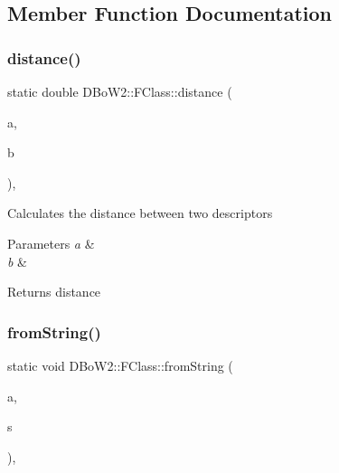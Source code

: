 \subsection{Member Function Documentation}
\mbox{\label{class_d_bo_w2_1_1_f_class_a56d4737dd67258389c808dbd10befa8c}} 
\subsubsection{\texorpdfstring{distance()}{distance()}}
{\footnotesize\ttfamily static double D\+Bo\+W2\+::\+F\+Class\+::distance (\begin{DoxyParamCaption}\item[{const T\+Descriptor \&}]{a,  }\item[{const T\+Descriptor \&}]{b }\end{DoxyParamCaption})\hspace{0.3cm}{\ttfamily [static]}, {\ttfamily [private]}}

Calculates the distance between two descriptors 
\begin{DoxyParams}{Parameters}
{\em a} & \\
\hline
{\em b} & \\
\hline
\end{DoxyParams}
\begin{DoxyReturn}{Returns}
distance 
\end{DoxyReturn}
\mbox{\label{class_d_bo_w2_1_1_f_class_a0f27985bf4c13f0a6c12ebc4822c1217}} 
\subsubsection{\texorpdfstring{from\+String()}{fromString()}}
{\footnotesize\ttfamily static void D\+Bo\+W2\+::\+F\+Class\+::from\+String (\begin{DoxyParamCaption}\item[{T\+Descriptor \&}]{a,  }\item[{const std\+::string \&}]{s }\end{DoxyParamCaption})\hspace{0.3cm}{\ttfamily [static]}, {\ttfamily [private]}}

